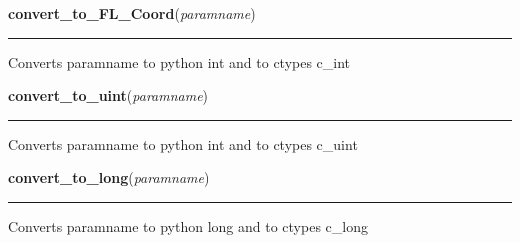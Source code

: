     \label{xformslib:library:convert_to_int}

    \vspace{0.5ex}

\hspace{.8\funcindent}\begin{boxedminipage}{\funcwidth}

    \raggedright \textbf{convert\_to\_FL\_Coord}(\textit{paramname})

    \vspace{-1.5ex}

    \rule{\textwidth}{0.5\fboxrule}
\setlength{\parskip}{2ex}
    Converts paramname to python int and to ctypes c\_int

\setlength{\parskip}{1ex}
    \end{boxedminipage}

    \label{xformslib:library:convert_to_uint}

    \vspace{0.5ex}

\hspace{.8\funcindent}\begin{boxedminipage}{\funcwidth}

    \raggedright \textbf{convert\_to\_uint}(\textit{paramname})

    \vspace{-1.5ex}

    \rule{\textwidth}{0.5\fboxrule}
\setlength{\parskip}{2ex}
    Converts paramname to python int and to ctypes c\_uint

\setlength{\parskip}{1ex}
    \end{boxedminipage}

    \label{xformslib:library:convert_to_long}

    \vspace{0.5ex}

\hspace{.8\funcindent}\begin{boxedminipage}{\funcwidth}

    \raggedright \textbf{convert\_to\_long}(\textit{paramname})

    \vspace{-1.5ex}

    \rule{\textwidth}{0.5\fboxrule}
\setlength{\parskip}{2ex}
    Converts paramname to python long and to ctypes c\_long

\setlength{\parskip}{1ex}
    \end{boxedminipage}

